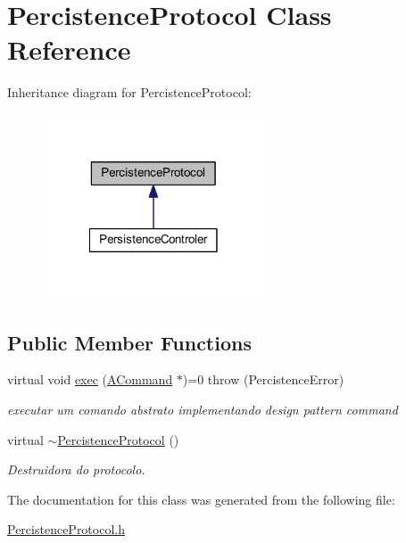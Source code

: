 \hypertarget{class_percistence_protocol}{\section{Percistence\-Protocol Class Reference}
\label{class_percistence_protocol}
}


Inheritance diagram for Percistence\-Protocol\-:
\nopagebreak
\begin{figure}[H]
\begin{center}
\leavevmode
\includegraphics[width=186pt]{class_percistence_protocol__inherit__graph}
\end{center}
\end{figure}
\subsection*{Public Member Functions}
\begin{DoxyCompactItemize}
\item 
\hypertarget{class_percistence_protocol_aabb1342054dba836dfd026254dbffafb}{virtual void \hyperlink{class_percistence_protocol_aabb1342054dba836dfd026254dbffafb}{exec} (\hyperlink{class_a_command}{A\-Command} $\ast$)=0  throw (\-Percistence\-Error)}\label{class_percistence_protocol_aabb1342054dba836dfd026254dbffafb}

\begin{DoxyCompactList}\small\item\em executar um comando abstrato implementando design pattern command \end{DoxyCompactList}\item 
\hypertarget{class_percistence_protocol_ad68bcb2a3e256694b59cafa2fcf43606}{virtual \hyperlink{class_percistence_protocol_ad68bcb2a3e256694b59cafa2fcf43606}{$\sim$\-Percistence\-Protocol} ()}\label{class_percistence_protocol_ad68bcb2a3e256694b59cafa2fcf43606}

\begin{DoxyCompactList}\small\item\em Destruidora do protocolo. \end{DoxyCompactList}\end{DoxyCompactItemize}


The documentation for this class was generated from the following file\-:\begin{DoxyCompactItemize}
\item 
\hyperlink{_percistence_protocol_8h}{Percistence\-Protocol.\-h}\end{DoxyCompactItemize}
